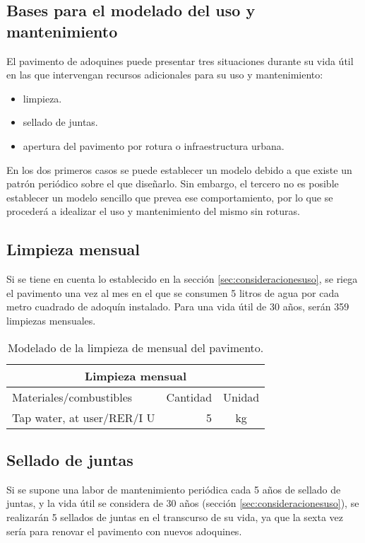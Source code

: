 \subsection{Bases para el modelado del uso y mantenimiento}
El pavimento de adoquines puede presentar tres situaciones durante su vida útil en las que intervengan recursos adicionales para su uso y mantenimiento:
\begin{itemize}
\item limpieza.
\item sellado de juntas.
\item apertura del pavimento por rotura o infraestructura urbana.
\end{itemize}

En los dos primeros casos se puede establecer un modelo debido a que existe un patrón periódico sobre el que diseñarlo. Sin embargo, el tercero no es posible establecer un modelo sencillo que prevea ese comportamiento, por lo que se procederá a idealizar el uso y mantenimiento del mismo sin roturas.

\subsection{Limpieza mensual}
Si se tiene en cuenta lo establecido en la sección \ref{sec:consideracionesuso}, se riega el pavimento una vez al mes en el que se consumen 5 litros de agua por cada metro cuadrado de adoquín instalado. Para una vida útil de 30 años, serán 359 limpiezas mensuales.

\begin{table}[!htb]
\centering
\begin{tabular}{p{8cm}rc}
\toprule
\multicolumn{3}{c}{Limpieza mensual}\\
\midrule
Materiales/combustibles & Cantidad & Unidad\\
\midrule
Tap water, at user/RER/I U & 5 & \si{kg}\\
\bottomrule
\end{tabular}
\caption{Modelado de la limpieza de mensual del pavimento.}
\label{modeladoagualimpiezamensual}
\end{table}

\subsection{Sellado de juntas}

Si se supone una labor de mantenimiento periódica cada 5 años de sellado de juntas, y la vida útil se considera de 30 años (sección \ref{sec:consideracionesuso}), se realizarán 5 sellados de juntas en el transcurso de su vida, ya que la sexta vez sería para renovar el pavimento con nuevos adoquines.


